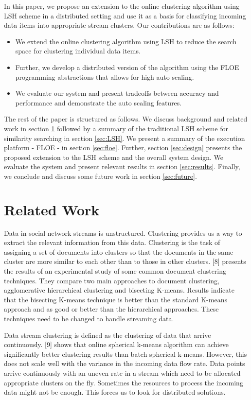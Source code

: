 \documentclass{article} %
\begin{document}
In this paper, we propose an extension to the online clustering algorithm using LSH scheme in a distributed setting and use it as a basis for classifying incoming data items into appropriate stream clusters. Our contributions are as follows:
\begin{itemize}
\item We extend the online clustering algorithm using LSH to reduce the search space for clustering individual data items.
\item Further, we develop a distributed version of the algorithm using the FLOE programming abstractions that allows for high auto scaling.
\item We evaluate our system and present tradeoffs between accuracy and performance and demonstrate the auto scaling features.
\end{itemize}


The rest of the paper is structured as follows. We discuss background and related work in section \ref{sec:related} followed by a summary of the traditional LSH scheme for similarity searching in section \ref{sec:LSH}.  We present a summary of the execution platform - FLOE - in section \ref{sec:floe}. Further, section \ref{sec:design} presents the proposed extension to the LSH scheme and the overall system design. We evaluate the system and present relevant results in section \ref{sec:results}. Finally, we conclude and discuss some future work in section \ref{sec:future}.


\section{Related Work}
\label{sec:related}
Data in social network streams is unstructured. Clustering provides us a way to extract the relevant information from this data. Clustering is the task of assigning a set of documents into clusters so that the documents in the same cluster are more similar to each other than to those in other clusters. [8] presents the results of an experimental study of some common document clustering techniques. They compare two main approaches to document clustering, agglomerative hierarchical clustering and bisecting K-means. Results indicate that the bisecting K-means technique is better than the standard K-means approach and as good or better than the hierarchical approaches. These techniques need to be changed to handle streaming data.

Data stream clustering is defined as the clustering of data that arrive continuously. [9] shows that online spherical k-means algorithm can achieve significantly better clustering results than batch spherical k-means. However, this does not scale well with the variance in the incoming data flow rate. Data points arrive continuously with an uneven rate in a stream which need to be allocated appropriate clusters on the fly. Sometimes the resources to process the incoming data might not be enough. This forces us to look for distributed solutions.
\end{document}
